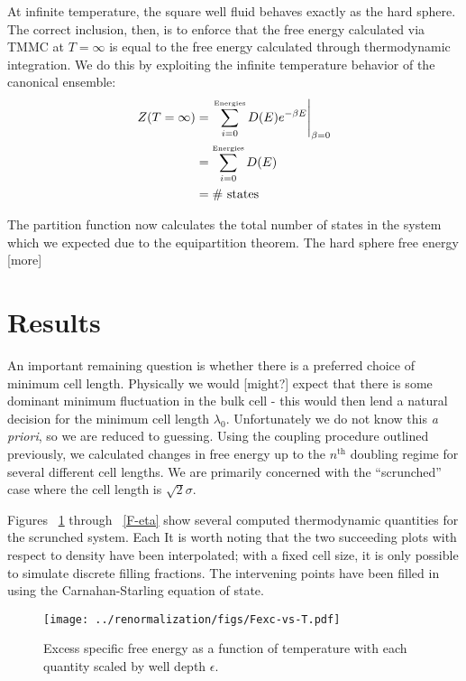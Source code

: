 \documentclass[12pt]{article}
\newcommand{\ignore}[1]{}
\begin{document}
At infinite temperature, the square well fluid behaves exactly as the hard sphere. The correct inclusion, then, is to enforce that the free energy calculated via TMMC at $T=\infty$ is equal to the free energy calculated through thermodynamic integration. We do this by exploiting the infinite temperature behavior of the canonical ensemble:
\begin{align}
    Z(T=\infty) &= \left.\sum_{i=0}^{\text{\tiny Energies}} D(E) e^{-\beta E}\right|_{\beta = 0}\\
    &= \sum_{i=0}^{\text{\tiny Energies}} D(E)\\
    &= \#\text{~states}
\end{align}

\ignore{NB: cough cough the HS energy probs wrong}
The partition function now calculates the total number of states in the system which we expected due to the equipartition theorem. The hard sphere free energy [more] 




\section{Results}
An important remaining question is whether there is a preferred choice of minimum cell length. Physically we would [might?] expect that there is some dominant minimum fluctuation in the bulk cell - this would then lend a natural decision for the minimum cell length $\lambda_0$. Unfortunately we do not know this {\it a priori}, so we are reduced to guessing. Using the coupling procedure outlined previously, we calculated changes in free energy up to the $n^{\text{th}}$ doubling regime for several different cell lengths. We are primarily concerned with the ``scrunched'' case where the cell length is $\sqrt2\sigma$.

Figures ~\ref{F-T} through ~\ref{F-eta} show several computed thermodynamic quantities for the scrunched system. Each  It is worth noting that the two succeeding plots with respect to density have been interpolated; with a fixed cell size, it is only possible to simulate discrete filling fractions. The intervening points have been filled in using the Carnahan-Starling equation of state.  
\begin{figure}[H]
\centering
    \texttt{[image: ../renormalization/figs/Fexc-vs-T.pdf]}
    \caption{Excess specific free energy as a function of temperature with each quantity scaled by well depth $\epsilon$. }
    \label{F-T}
\end{figure}
\end{document}
